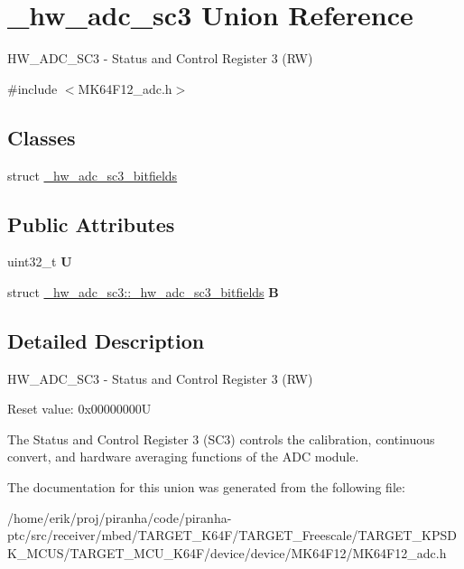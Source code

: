\hypertarget{union__hw__adc__sc3}{}\section{\+\_\+hw\+\_\+adc\+\_\+sc3 Union Reference}
\label{union__hw__adc__sc3}


H\+W\+\_\+\+A\+D\+C\+\_\+\+S\+C3 -\/ Status and Control Register 3 (RW)  




{\ttfamily \#include $<$M\+K64\+F12\+\_\+adc.\+h$>$}

\subsection*{Classes}
\begin{DoxyCompactItemize}
\item 
struct \hyperlink{struct__hw__adc__sc3_1_1__hw__adc__sc3__bitfields}{\+\_\+hw\+\_\+adc\+\_\+sc3\+\_\+bitfields}
\end{DoxyCompactItemize}
\subsection*{Public Attributes}
\begin{DoxyCompactItemize}
\item 
uint32\+\_\+t {\bfseries U}\hypertarget{union__hw__adc__sc3_ae04454043d099955bc24fd4ac5f37d94}{}\label{union__hw__adc__sc3_ae04454043d099955bc24fd4ac5f37d94}

\item 
struct \hyperlink{struct__hw__adc__sc3_1_1__hw__adc__sc3__bitfields}{\+\_\+hw\+\_\+adc\+\_\+sc3\+::\+\_\+hw\+\_\+adc\+\_\+sc3\+\_\+bitfields} {\bfseries B}\hypertarget{union__hw__adc__sc3_a333c49536e0f326987271cac11c2426c}{}\label{union__hw__adc__sc3_a333c49536e0f326987271cac11c2426c}

\end{DoxyCompactItemize}


\subsection{Detailed Description}
H\+W\+\_\+\+A\+D\+C\+\_\+\+S\+C3 -\/ Status and Control Register 3 (RW) 

Reset value\+: 0x00000000U

The Status and Control Register 3 (S\+C3) controls the calibration, continuous convert, and hardware averaging functions of the A\+DC module. 

The documentation for this union was generated from the following file\+:\begin{DoxyCompactItemize}
\item 
/home/erik/proj/piranha/code/piranha-\/ptc/src/receiver/mbed/\+T\+A\+R\+G\+E\+T\+\_\+\+K64\+F/\+T\+A\+R\+G\+E\+T\+\_\+\+Freescale/\+T\+A\+R\+G\+E\+T\+\_\+\+K\+P\+S\+D\+K\+\_\+\+M\+C\+U\+S/\+T\+A\+R\+G\+E\+T\+\_\+\+M\+C\+U\+\_\+\+K64\+F/device/device/\+M\+K64\+F12/M\+K64\+F12\+\_\+adc.\+h\end{DoxyCompactItemize}
